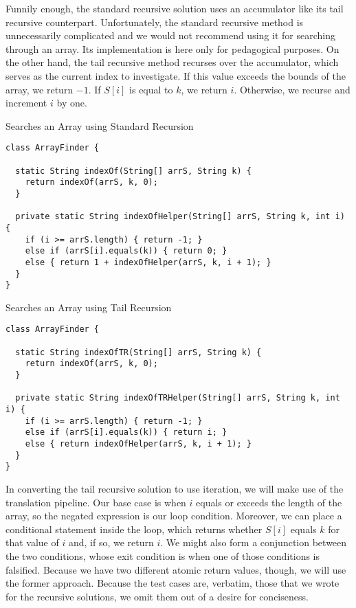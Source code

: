 Funnily enough, the standard recursive solution uses an accumulator like its tail recursive counterpart. Unfortunately, the standard recursive method is unnecessarily complicated and we would not recommend using it for searching through an array. Its implementation is here only for pedagogical purposes. On the other hand, the tail recursive method recurses over the accumulator, which serves as the current index to investigate. If this value exceeds the bounds of the array, we return $-1$. If $S[i]$ is equal to $k$, we return $i$. Otherwise, we recurse and increment $i$ by one.

\begin{cl}{Searches an Array using Standard Recursion}
\begin{lstlisting}[language=MyJava]
class ArrayFinder {

  static String indexOf(String[] arrS, String k) {
    return indexOf(arrS, k, 0);
  }

  private static String indexOfHelper(String[] arrS, String k, int i) {
    if (i >= arrS.length) { return -1; } 
    else if (arrS[i].equals(k)) { return 0; } 
    else { return 1 + indexOfHelper(arrS, k, i + 1); }
  } 
}
\end{lstlisting}
\end{cl}

\begin{cl}{Searches an Array using Tail Recursion}
\begin{lstlisting}[language=MyJava]
class ArrayFinder {

  static String indexOfTR(String[] arrS, String k) {
    return indexOf(arrS, k, 0);
  }

  private static String indexOfTRHelper(String[] arrS, String k, int i) {
    if (i >= arrS.length) { return -1; } 
    else if (arrS[i].equals(k)) { return i; } 
    else { return indexOfHelper(arrS, k, i + 1); }
  } 
}
\end{lstlisting}
\end{cl}

In converting the tail recursive solution to use iteration, we will make use of the translation pipeline. Our base case is when $i$ equals or exceeds the length of the array, so the negated expression is our loop condition. Moreover, we can place a conditional statement inside the loop, which returns whether $S[i]$ equals $k$ for that value of $i$ and, if so, we return $i$. We might also form a conjunction between the two conditions, whose exit condition is when one of those conditions is falsified. Because we have two different atomic return values, though, we will use the former approach. Because the test cases are, verbatim, those that we wrote for the recursive solutions, we omit them out of a desire for conciseness.

